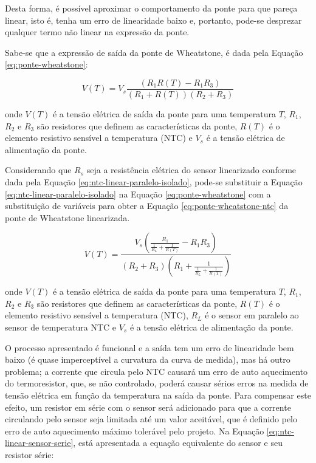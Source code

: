 \documentclass[a4paper]{instrumentacao}
\begin{document}
Desta forma, é possível aproximar o comportamento da ponte para que pareça linear, isto é, tenha um erro de linearidade baixo e, portanto, pode-se desprezar qualquer termo não linear na expressão da ponte.

Sabe-se que a expressão de saída da ponte de Wheatstone, é dada pela Equação \ref{eq:ponte-wheatstone}:

\begin{equation}
	V(T) = V_s \frac{(R_1 R(T)- R_1 R_3)}{(R_1+R(T)) (R_2+R_3)}
	\label{eq:ponte-wheatstone}
\end{equation}

\noindent onde $V(T)$ é a tensão elétrica de saída da ponte para uma temperatura $T$, $R_1$, $R_2$ e $R_3$ são resistores que definem as características da ponte, $R(T)$ é o elemento resistivo sensível a temperatura (NTC) e $V_s$ é a tensão elétrica de alimentação da ponte.

Considerando que $R_s$ seja a resistência elétrica do sensor linearizado conforme dada pela Equação \ref{eq:ntc-linear-paralelo-isolado}, pode-se substituir a Equação \ref{eq:ntc-linear-paralelo-isolado} na Equação \ref{eq:ponte-wheatstone} com a substituição de variáveis para obter a Equação \ref{eq:ponte-wheatstone-ntc} da ponte de Wheatstone linearizada.

\begin{equation}
	V(T) = \frac{V_s \left(\frac{R_1}{\frac{1}{R_L}+\frac{1}{R(T)}}-R_1 R_3\right)}{(R_2+R_3) \left(R_1+\frac{1}{\frac{1}{R_L}+\frac{1}{R(T)}}\right)}
	\label{eq:ponte-wheatstone-ntc}
\end{equation}

\noindent onde $V(T)$ é a tensão elétrica de saída da ponte para uma temperatura $T$, $R_1$, $R_2$ e $R_3$ são resistores que definem as características da ponte, $R(T)$ é o elemento resistivo sensível a temperatura (NTC), $R_L$ é o sensor em paralelo ao sensor de temperatura NTC e $V_s$ é a tensão elétrica de alimentação da ponte.

O processo apresentado é funcional e a saída tem um erro de linearidade bem baixo (é quase imperceptível a curvatura da curva de medida), mas há outro problema; a corrente que circula pelo NTC causará um erro de auto aquecimento do termoresistor, que, se não controlado, poderá causar sérios erros na medida de tensão elétrica em função da temperatura na saída da ponte. Para compensar este efeito, um resistor em série com o sensor será adicionado para que a corrente circulando pelo sensor seja limitada até um valor aceitável, que é definido pelo erro de auto aquecimento máximo tolerável pelo projeto. Na Equação \ref{eq:ntc-linear-sensor-serie}, está apresentada a equação equivalente do sensor e seu resistor série:
\end{document}
